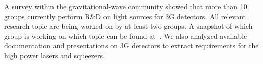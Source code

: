 

A survey within the gravitational-wave community showed that more than 10 groups currently perform R\&D on light sources for 3G detectors. All relevant research topic are being worked on by at least two groups. A snapshot of which group is working on which topic can be found at~\cite{LightSource_RD_table}. We also analyzed available documentation and presentations on 3G detectors to extract requirements for the high power lasers and squeezers.

